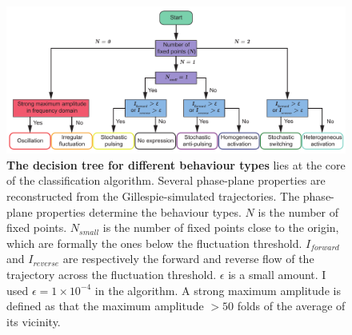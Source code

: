 \begin{figure}[ht]
    \centering
    \includegraphics[width=6in]{classifier_flowchart_remake}
    \caption[The decision tree for different behaviour types] {
        \textbf{The decision tree for different behaviour types} lies at
        the core of the classification algorithm. Several phase-plane
        properties are reconstructed from the Gillespie-simulated trajectories.
        The phase-plane properties determine the behaviour types.
        $N$ is the number of fixed points. $N_{small}$ is the number of
        fixed points close to the origin, which are formally the ones below
        the fluctuation threshold.
        $I_{forward}$ and $I_{reverse}$ are respectively the forward and
        reverse flow of the trajectory across the fluctuation threshold.
        $\epsilon$ is a small amount. I used $\epsilon = 1 \times 10^{-4}$
        in the algorithm.
        A strong maximum amplitude is defined as that the maximum amplitude 
        $> 50$ folds of the average of its vicinity.
    }
    \label{fig:classifier_flowchart}
\end{figure}



